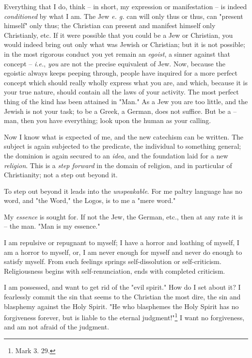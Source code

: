 Everything that I do, think -- in short, my expression or manifestation -- is 
indeed \textit{conditioned} by what I am. The Jew \textit{e. g.} can will only 
thus or thus, can "{}present himself"{} only thus; the Christian can present 
and manifest himself only Christianly, etc. If it were possible that you could 
be a Jew or Christian, you would indeed bring out only what was Jewish or 
Christian; but it is not possible; in the most rigorous conduct you yet remain 
an \textit{egoist}, a sinner against that concept -- \textit{i.e.}, 
\textit{you} are not the precise equivalent of Jew. Now, because the egoistic 
always keeps peeping through, people have inquired for a more perfect concept 
which should really wholly express what you are, and which, because it is your 
true nature, should contain all the laws of your activity. The most perfect 
thing of the kind has been attained in "{}Man."{} As a Jew you are too little, 
and the Jewish is not your task; to be a Greek, a German, does not suffice. 
But be a -- man, then you have everything; look upon the human as your 
calling.

Now I know what is expected of me, and the new catechism can be written. The 
subject is again subjected to the predicate, the individual to something 
general; the dominion is again secured to an \textit{idea}, and the foundation 
laid for a new \textit{religion}. This is a \textit{step forward} in the 
domain of religion, and in particular of Christianity; not a step out beyond 
it.

To step out beyond it leads into the \textit{unspeakable}. For me paltry 
language has no word, and "{}the Word,"{} the Logos, is to me a "{}mere 
word."{}

My \textit{essence} is sought for. If not the Jew, the German, etc., then at 
any rate it is -- the man. "{}Man is my essence."{}

I am repulsive or repugnant to myself; I have a horror and loathing of myself, 
I am a horror to myself, or, I am never enough for myself and never do enough 
to satisfy myself. From such feelings springs self-dissolution or 
self-criticism. Religiousness begins with self-renunciation, ends with 
completed criticism.

I am possessed, and want to get rid of the "{}evil spirit."{} How do I set 
about it? I fearlessly commit the sin that seems to the Christian the most 
dire, the sin and blasphemy against the Holy Spirit. "{}He who blasphemes the 
Holy Spirit has no forgiveness forever, but is liable to the eternal 
judgment!"{}\footnote{Mark 3. 29.} I want no forgiveness, and am not afraid of 
the judgment.

